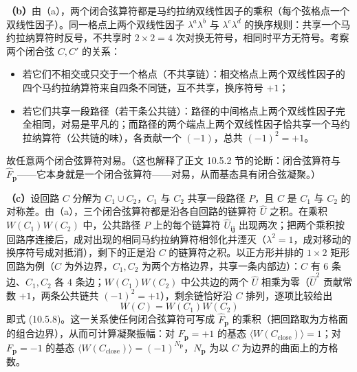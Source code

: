 \textbf{（b）}由（a），两个闭合弦算符都是马约拉纳双线性因子的乘积（每个弦格点一个双线性因子）。同一格点上两个双线性因子 $\lambda^{a}\lambda^{b}$ 与 $\lambda^{c}\lambda^{d}$ 的换序规则：共享一个马约拉纳算符时反号，不共享时 $2\times2=4$ 次对换无符号，相同时平方无符号。考察两个闭合弦 $C,C'$ 的关系：
\begin{itemize}
\item 若它们不相交或只交于一个格点（不共享链）：相交格点上两个双线性因子的四个马约拉纳算符来自四条不同链，互不共享，换序符号 $+1$；
\item 若它们共享一段路径（若干条公共链）：路径的中间格点上两个双线性因子完全相同，对易是平凡的；而路径的两个端点上两个双线性因子恰共享一个马约拉纳算符（公共链的味），各贡献一个 $(-1)$，总共 $(-1)^{2}=+1$。
\end{itemize}
故任意两个闭合弦算符对易。（这也解释了正文 10.5.2 节的论断：闭合弦算符与 $\hat F_{\pmb p}$——它本身就是一个闭合弦算符——对易，从而基态具有闭合弦凝聚。）

\textbf{（c）}设回路 $C$ 分解为 $C_1\cup C_2$，$C_1$ 与 $C_2$ 共享一段路径 $P$，且 $C$ 是 $C_1$ 与 $C_2$ 的对称差。由（a），三个闭合弦算符都是沿各自回路的链算符 $\hat U$ 之积。在乘积 $W(C_1)W(C_2)$ 中，公共路径 $P$ 上的每个链算符 $\hat U_{\pmb{i}\pmb j}$ 出现两次；把两个乘积按回路序连接后，成对出现的相同马约拉纳算符相邻化并湮灭（$\lambda^{2}=1$，成对移动的换序符号成对抵消），剩下的正是沿 $C$ 的链算符之积。以正方形并排的 $1\times2$ 矩形回路为例（$C$ 为外边界，$C_1,C_2$ 为两个方格边界，共享一条内部边）：$C$ 有 $6$ 条边、$C_1,C_2$ 各 $4$ 条边；$W(C_1)W(C_2)$ 中公共边的两个 $\hat U$ 相乘为零（$\hat U^2$ 贡献常数 $+1$，两条公共链共 $(-1)^2=+1$），剩余链恰好沿 $C$ 排列，逐项比较给出
\begin{equation*}
\boxed{\;W(C)=W(C_1)W(C_2)\;}
\end{equation*}
即式 (10.5.8)。这一关系使任何闭合弦算符可写成 $\hat F_{\pmb p}$ 的乘积（把回路取为方格面的组合边界），从而可计算凝聚振幅：对 $F_{\pmb p}=+1$ 的基态 $\langle W(C_{\text{close}})\rangle=1$；对 $F_{\pmb p}=-1$ 的基态 $\langle W(C_{\text{close}})\rangle=(-1)^{N_{\pmb p}}$，$N_{\pmb p}$ 为以 $C$ 为边界的曲面上的方格数。

